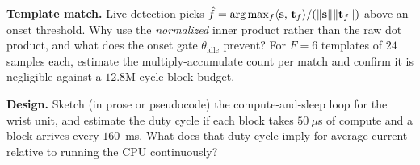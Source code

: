 \begin{exercise}
\textbf{Template match.} Live detection picks $\hat{f}=\arg\max_f
\langle \mathbf{s},\, \mathbf{t}_f \rangle/(\lVert\mathbf{s}\rVert\lVert\mathbf{t}_f\rVert)$ above an onset threshold.
Why use the \emph{normalized} inner product rather than the raw dot product, and what does the onset
gate $\theta_{\text{idle}}$ prevent? For $F=6$ templates of $24$ samples each, estimate the
multiply-accumulate count per match and confirm it is negligible against a $12.8$M-cycle block
budget.
\end{exercise}

\begin{exercise}
\textbf{Design.} Sketch (in prose or pseudocode) the compute-and-sleep loop for the wrist unit, and
estimate the duty cycle if each block takes $50~\mu$s of compute and a block arrives every $160$~ms.
What does that duty cycle imply for average current relative to running the CPU continuously?
\end{exercise}
